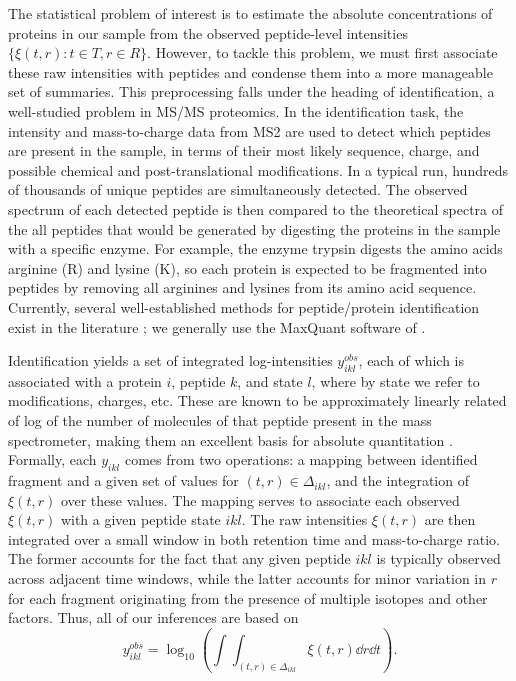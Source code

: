 
The statistical problem of interest is to estimate the absolute concentrations of proteins in our sample from the observed peptide-level intensities $\{\xi(t, r):t\in T,r\in R\}$.
However, to tackle this problem, we must first associate these raw intensities with peptides and condense them into a more manageable set of summaries.
This preprocessing falls under the heading of identification, a well-studied problem in MS/MS proteomics.
%
In the identification task, the intensity and mass-to-charge data from MS2 are used to detect which peptides are present in the sample, in terms of their most likely sequence, charge, and possible chemical and post-translational modifications.
In a typical run, hundreds of thousands of unique peptides are simultaneously detected.
The observed spectrum of each detected peptide is then compared to the theoretical spectra of the all peptides that would be generated by digesting the proteins in the sample with a specific enzyme.
For example, the enzyme trypsin digests the amino acids arginine (R) and lysine (K), so each protein is expected to be fragmented into peptides by removing all arginines and lysines from its amino acid sequence.
Currently, several well-established methods for peptide/protein identification exist in the literature \citep{Cox:2008uu,Perkins:1999ed,Eng:1994fj}; we generally use the MaxQuant software of \citet{Cox:2008uu}.

Identification yields a set of integrated log-intensities $y_{ikl}^{obs}$, each of which is associated with a protein $i$, peptide $k$, and state $l$, where by state we refer to modifications, charges, etc.
These are known to be approximately linearly related of log of the number of molecules of that peptide present in the mass spectrometer, making them an excellent basis for absolute quantitation \citep{Old:2005jf,Scigelova:2011dt}.
Formally, each $y_{ikl}$ comes from two operations: a mapping between identified fragment and a given set of values for $(t, r) \in \Delta_{ikl}$, and the integration of $\xi(t,r)$ over these values.
%
The mapping serves to associate each observed $\xi(t, r)$ with a given peptide state $ikl$.
The raw intensities $\xi(t, r)$ are then integrated over a small window in both retention time and mass-to-charge ratio.
The former accounts for the fact that any given peptide $ikl$ is typically observed across adjacent time windows, while the latter accounts for minor variation in $r$ for each fragment originating from the presence of multiple isotopes and other factors.
Thus, all of our inferences are based on
%
\begin{equation}
y_{ikl}^{obs} = \log_{10}\left( \int \! \int_{(t, r) \in \Delta_{ikl}} \xi(t, r) \dd r \dd t \right) .
\end{equation}

